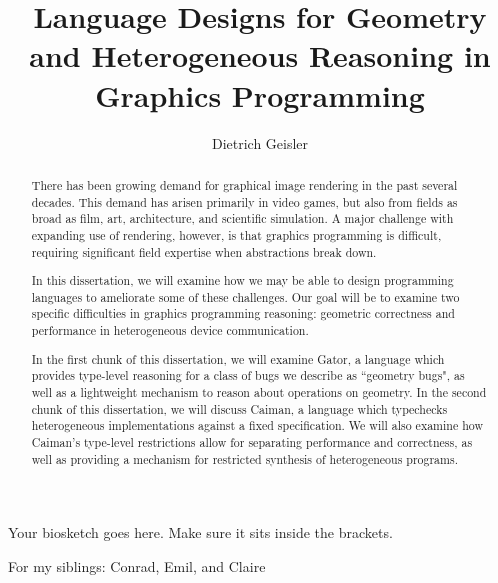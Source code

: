 \documentclass[phd,tocprelim]{cornell}
\title {Language Designs for Geometry and Heterogeneous Reasoning in Graphics Programming}
\author {Dietrich Geisler}
\begin{document}
\maketitle
\makecopyright

\mathligson

\begin{abstract}
There has been growing demand for graphical image rendering in the past several decades.  This demand has arisen primarily in video games, but also from fields as broad as film, art, architecture, and scientific simulation.  A major challenge with expanding use of rendering, however, is that graphics programming is difficult, requiring significant field expertise when abstractions break down.

In this dissertation, we will examine how we may be able to design programming languages to ameliorate some of these challenges.  Our goal will be to examine two specific difficulties in graphics programming reasoning: geometric correctness and performance in heterogeneous device communication.  

In the first chunk of this dissertation, we will examine Gator, a language which provides type-level reasoning for a class of bugs we describe as ``geometry bugs", as well as a lightweight mechanism to reason about operations on geometry.  In the second chunk of this dissertation, we will discuss Caiman, a language which typechecks heterogeneous implementations against a fixed specification.  We will also examine how Caiman's type-level restrictions allow for separating performance and correctness, as well as providing a mechanism for restricted synthesis of heterogeneous programs.
\end{abstract}

\begin{biosketch}
Your biosketch goes here. Make sure it sits inside
the brackets.
\end{biosketch}

\begin{dedication}
For my siblings: Conrad, Emil, and Claire
\end{dedication}
\end{document}
